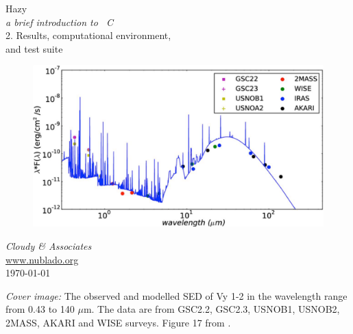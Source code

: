 \documentclass[12pt]{book}
\begin{document}
\frontmatter

\begin{titlepage}
\begin{center}

\Huge
Hazy\\
\Large
\emph{a brief introduction to \Cloudy\ C\VERSION}\\
\LARGE
2. Results, computational environment,\\
and test suite

\begin{figure}
\begin{center}
\includegraphics[clip=on,width=0.8\columnwidth,keepaspectratio]{Akras15}
\end{center}
\end{figure}

\vspace{15 mm }
\LARGE
\emph{Cloudy \& Associates} \\
\Large
\href{http://www.nublado.org}{www.nublado.org} \\
\normalsize
\today
\end{center}
\end{titlepage}

\clearpage

\vspace{5mm}
\noindent
{\small
{\em Cover image:} The observed and modelled SED of Vy 1-2 in the wavelength range from 0.43 to 140 ${\mu}$m.
The data are from GSC2.2, GSC2.3, USNOB1, USNOB2, 2MASS, AKARI and WISE surveys.
Figure 17 from \citet{2015MNRAS.452.2911A}.
}
\clearpage

\setcounter{tocdepth}{2}
\tableofcontents
\listoffigures
\listoftables

\clearpage
\mainmatter
\appendix

\backmatter


\end{document}

